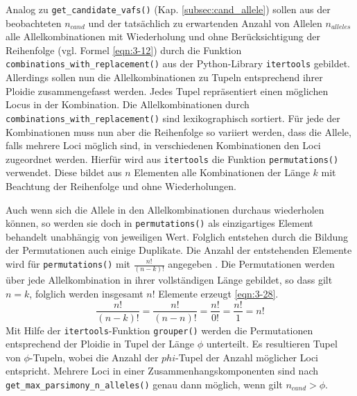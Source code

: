 Analog zu \lstinline|get_candidate_vafs()| (Kap. \ref{subsec:cand_allele}) sollen aus der beobachteten $n_{cand} $ und der tatsächlich zu erwartenden Anzahl von Allelen $n_{alleles}$ alle Allelkombinationen mit Wiederholung und ohne Berücksichtigung der Reihenfolge  (vgl. Formel \eqref{eqn:3-12}) durch die Funktion \lstinline|combinations_with_replacement()| aus der Python-Library \lstinline|itertools| gebildet. Allerdings sollen nun die Allelkombinationen zu Tupeln entsprechend ihrer Ploidie zusammengefasst werden. Jedes Tupel repräsentiert einen möglichen Locus in der Kombination. Die Allelkombinationen durch \lstinline|combinations_with_replacement()| sind lexikographisch sortiert. Für jede der Kombinationen muss nun aber die Reihenfolge so variiert werden, dass die Allele, falls mehrere Loci möglich sind, in verschiedenen Kombinationen den Loci zugeordnet werden. Hierfür wird aus \lstinline|itertools| die Funktion \lstinline|permutations()| verwendet. Diese bildet aus $ n $ Elementen alle Kombinationen der Länge $ k $ mit Beachtung der Reihenfolge und ohne Wiederholungen.

Auch wenn sich die Allele in den Allelkombinationen durchaus wiederholen können, so werden sie doch in \lstinline|permutations()| als einzigartiges Element behandelt unabhängig von jeweiligen Wert. Folglich entstehen durch die Bildung der Permutationen auch einige Duplikate. Die Anzahl der entstehenden Elemente wird für \lstinline|permutations()| mit  $ \frac{n!}{(n-k)!} $ angegeben \cite{itertools}. Die Permutationen werden über jede Allelkombination in ihrer vollständigen Länge gebildet, so dass gilt $ n = k $, folglich werden insgesamt $ n! $ Elemente erzeugt \eqref{eqn:3-28}. 
\begin{equation} \label{eqn:3-28}
\tag{3-28}
\frac{n!}{(n-k)!}=\frac{n!}{(n-n)!}=\frac{n!}{0!}=\frac{n!}{1}=n!
\end{equation}
Mit Hilfe der \lstinline|itertools|-Funktion \lstinline|grouper()| werden die Permutationen entsprechend der Ploidie in Tupel der Länge $\phi$ unterteilt. Es resultieren Tupel von $ \phi $-Tupeln, wobei die Anzahl der $phi$-Tupel der Anzahl möglicher Loci entspricht. Mehrere Loci in einer Zusammenhangskomponenten sind nach \lstinline|get_max_parsimony_n_alleles()| genau dann möglich, wenn gilt $n_{cand} > \phi $.\\

